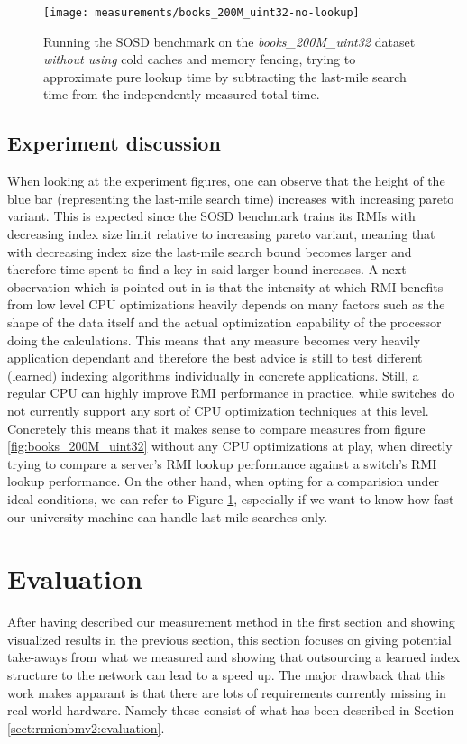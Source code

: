 \captionsetup[figure]{skip=10pt} %
\begin{figure}[!ht]
  \centering
  \texttt{[image: measurements/books\_200M\_uint32-no-lookup]}
  \caption[Last-mile search time measures and lookup time approximation \emph{without using} cold caches and memory fencing]{
    Running the SOSD benchmark on the \emph{books\_200M\_uint32} dataset \emph{without using} cold caches and memory fencing, trying to approximate pure lookup time by subtracting the last-mile search time from the independently measured total time.
  }
  \label{fig:books_200M_uint32-no-lookup}
\end{figure}

\subsection{Experiment discussion}
When looking at the experiment figures, one can observe that the height of the blue bar (representing the last-mile search time) increases with increasing pareto variant. This is expected since the SOSD benchmark trains its RMIs with decreasing index size limit relative to increasing pareto variant, meaning that with decreasing index size the last-mile search bound becomes larger and therefore time spent to find a key in said larger bound increases. A next observation which is pointed out in \cite{sosd-vldb} is that the intensity at which RMI benefits from low level CPU optimizations heavily depends on many factors such as the shape of the data itself and the actual optimization capability of the processor doing the calculations. This means that any measure becomes very heavily application dependant and therefore the best advice is still to test different (learned) indexing algorithms individually in concrete applications. Still, a regular CPU can highly improve RMI performance in practice, while switches do not currently support any sort of CPU optimization techniques at this level. Concretely this means that it makes sense to compare measures from figure \ref{fig:books_200M_uint32} without any CPU optimizations at play, when directly trying to compare a server's RMI lookup performance against a switch's RMI lookup performance. On the other hand, when opting for a comparision under ideal conditions, we can refer to Figure \ref{fig:books_200M_uint32-no-lookup}, especially if we want to know how fast our university machine can handle last-mile searches only.

\section{Evaluation}
After having described our measurement method in the first section and showing visualized results in the previous section, this section focuses on giving potential take-aways from what we measured and showing that outsourcing a learned index structure to the network can lead to a speed up. The major drawback that this work makes apparant is that there are lots of requirements currently missing in real world hardware. Namely these consist of what has been described in Section \ref{sect:rmionbmv2:evaluation}.\\

